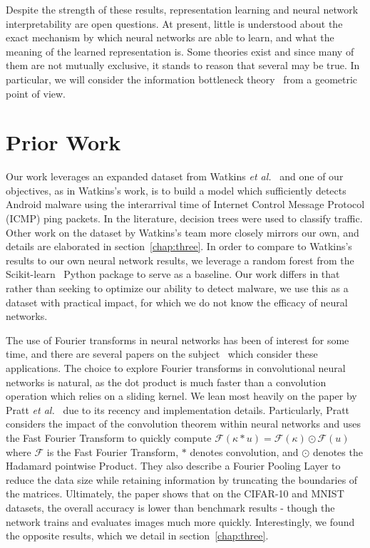 Despite the strength of these results, representation learning and neural network interpretability are open questions.
At present, little is understood about the exact mechanism by which neural networks are able to learn, and what the meaning of the learned representation is.
Some theories exist and since many of them are not mutually exclusive, it stands to reason that several may be true.
In particular, we will consider the information bottleneck theory~\cite{tishby2015deep, fischer2020conditional} from a geometric point of view.

\section{Prior Work}
Our work leverages an expanded dataset from Watkins \textit{et al.}~\cite{watkins2013using} and one of our objectives, as in Watkins's work, is to build a model which sufficiently detects Android malware using the interarrival time of Internet Control Message Protocol (ICMP) ping packets.
In the literature, decision trees were used to classify traffic.
Other work on the dataset by Watkins's team more closely mirrors our own, and details are elaborated in section~\ref{chap:three}.
In order to compare to Watkins's results to our own neural network results, we leverage a random forest from the Scikit-learn~\cite{scikit-learn} Python package to serve as a baseline.
Our work differs in that rather than seeking to optimize our ability to detect malware, we use this as a dataset with practical impact, for which we do not know the efficacy of neural networks.

The use of Fourier transforms in neural networks has been of interest for some time, and there are several papers on the subject~\cite{osowski2002fourier, pratt2017fcnn, highlander2016very} which consider these applications.
The choice to explore Fourier transforms in convolutional neural networks is natural, as the dot product is much faster than a convolution operation which relies on a sliding kernel. 
We lean most heavily on the paper by Pratt \textit{et al.}~\cite{pratt2017fcnn} due to its recency and implementation details. 
Particularly, Pratt considers the impact of the convolution theorem within neural networks and uses the Fast Fourier Transform to quickly compute $\mathcal{F}(\kappa * u) = \mathcal{F}(\kappa) \odot \mathcal{F}(u)$ where $\mathcal{F}$ is the Fast Fourier Transform, $*$ denotes convolution, and $\odot$ denotes the Hadamard pointwise Product.
They also describe a Fourier Pooling Layer to reduce the data size while retaining information by truncating the boundaries of the matrices.
Ultimately, the paper shows that on the CIFAR-10 and MNIST datasets, the overall accuracy is lower than benchmark results - though the network trains and evaluates images much more quickly.
Interestingly, we found the opposite results, which we detail in section~\ref{chap:three}.

